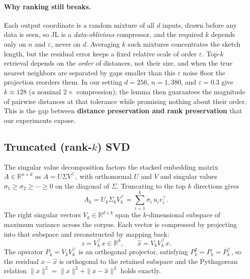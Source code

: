 \documentclass[11pt]{article}
\begin{document}
\paragraph{Why ranking still breaks.} Each output coordinate is a random mixture of all $d$ inputs, drawn before any data is seen, so JL is a \emph{data-oblivious} compressor, and the required $k$ depends only on $n$ and $\varepsilon$, never on $d$. Averaging $k$ such mixtures concentrates the sketch length, but the residual error keeps a fixed relative scale of order $\varepsilon$. Top-$k$ retrieval depends on the \emph{order} of distances, not their size, and when the true nearest neighbors are separated by gaps smaller than this $\varepsilon$ noise floor the projection reorders them. In our setting $d = 256$, $n = 1{,}380$, and $\varepsilon = 0.3$ give $k \approx 128$ (a nominal $2\times$ compression); the lemma then guarantees the magnitude of pairwise distances at that tolerance while promising nothing about their order. This is the gap between \textbf{distance preservation and rank preservation} that our experiments expose.

\subsection{Truncated (rank-\texorpdfstring{$k$}{k}) SVD}

The singular value decomposition factors the stacked embedding matrix $A \in \mathbb{R}^{n \times d}$ as $A = U \Sigma V^\top$, with orthonormal $U$ and $V$ and singular values $\sigma_1 \ge \sigma_2 \ge \cdots \ge 0$ on the diagonal of $\Sigma$. Truncating to the top $k$ directions gives
\begin{equation}
A_k = U_k \Sigma_k V_k^\top = \sum_{i=1}^{k} \sigma_i\, u_i v_i^\top.
\end{equation}
The right singular vectors $V_k \in \mathbb{R}^{d \times k}$ span the $k$-dimensional subspace of maximum variance across the corpus. Each vector is compressed by projecting into that subspace and reconstructed by mapping back:
\begin{equation}
z = V_k^\top x \in \mathbb{R}^k, \qquad \hat{x} = V_k V_k^\top x.
\end{equation}
The operator $P_k = V_k V_k^\top$ is an orthogonal projector, satisfying $P_k^2 = P_k = P_k^\top$, so the residual $x - \hat{x}$ is orthogonal to the retained subspace and the Pythagorean relation $\|x\|^2 = \|\hat{x}\|^2 + \|x - \hat{x}\|^2$ holds exactly.
\end{document}
